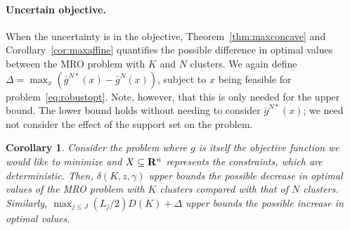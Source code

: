\documentclass[12pt]{article}
\theoremstyle{thmstyleone}%
\newtheorem{corollary}[theorem]{Corollary}%
\theoremstyle{thmstyletwo}%
\theoremstyle{thmstylethree}%
\newcommand{\reviewChanges}{}
\begin{document}
\reviewChanges{
\paragraph{Uncertain objective.}%
\label{par:uncertain_objective_max}
When the uncertainty is in the objective, Theorem~\ref{thm:maxconcave} and Corollary~\ref{cor:maxaffine} quantifies the possible difference in optimal values between the \gls{MRO} problem with $K$ and $N$ clusters. We again define ${\Delta = \max_{x}\left(\bar{g}^{N*}(x) - \bar{g}^{N}(x)\right)}$, subject to $x$ being feasible for problem~\eqref{eq:robustopt}. 
Note, however, that this is only needed for the upper bound. The lower bound holds without needing to consider $\bar{g}^{N*}(x)$; we need not consider the effect of the support set on the problem.
\begin{corollary}
	\label{cor:obj_unc_max}
Consider the problem where $g$ is itself the objective function we would like to minimize and $X \subseteq {\mathbf R}^n$ represents the constraints, which are deterministic.
Then, $\delta(K,z,\gamma)$ upper bounds the possible decrease in optimal values of the \gls{MRO} problem with $K$ clusters compared with that of $N$ clusters. 
Similarly, $\max_{j\leq J}(L_j/2)D(K) + \Delta$ upper bounds the possible increase in optimal values.
\end{corollary}}
\end{document}
